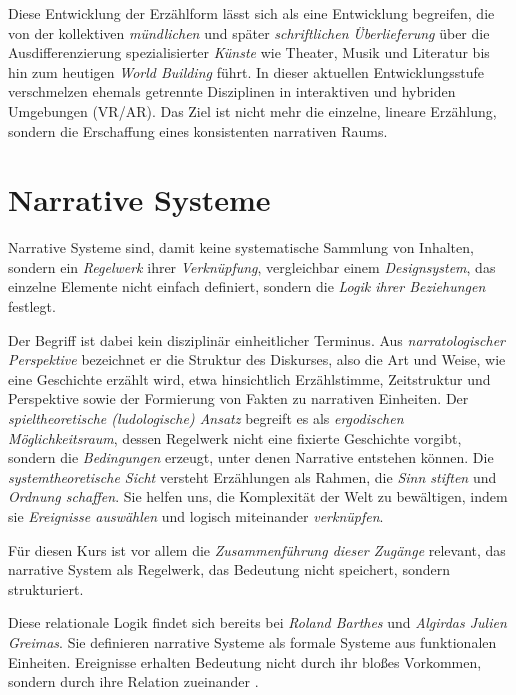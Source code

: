 \documentclass[parskip=half,a4paper,11pt]{scrreprt}
\begin{document}
Diese Entwicklung der Erzählform lässt sich als eine Entwicklung begreifen, die von der kollektiven \textit{mündlichen} und später \textit{schriftlichen} \textit{Überlieferung} über die Ausdifferenzierung spezialisierter \textit{Künste} wie Theater, Musik und Literatur bis hin zum heutigen \textit{World Building} führt. In dieser aktuellen Entwicklungsstufe verschmelzen ehemals getrennte Disziplinen in interaktiven und hybriden Umgebungen (VR/AR). Das Ziel ist nicht mehr die einzelne, lineare Erzählung, sondern die Erschaffung eines konsistenten narrativen Raums.

\section{Narrative Systeme}

Narrative Systeme sind, damit keine systematische Sammlung von Inhalten, sondern ein \textit{Regelwerk} ihrer \textit{Verknüpfung}, vergleichbar einem \textit{Designsystem}, das einzelne Elemente nicht einfach definiert, sondern die \textit{Logik ihrer Beziehungen }festlegt. 

Der Begriff ist dabei kein disziplinär einheitlicher Terminus. Aus \textit{narratologischer Perspektive} \citep{Genette1972,Schmid2005} bezeichnet er die Struktur des Diskurses, also die Art und Weise, wie eine Geschichte erzählt wird, etwa hinsichtlich Erzählstimme, Zeitstruktur und Perspektive sowie der Formierung von Fakten zu narrativen Einheiten. Der \textit{spieltheoretische (ludologische) Ansatz} \citep{Aarseth1997, Murray1997} begreift es als \textit{ergodischen} \textit{Möglichkeitsraum}, dessen Regelwerk nicht eine fixierte Geschichte vorgibt, sondern die \textit{Bedingungen} erzeugt, unter denen Narrative entstehen können. Die \textit{systemtheoretische Sicht} \citep{Luhmann1984,Bruner1990} versteht Erzählungen als Rahmen, die \textit{Sinn stiften} und \textit{Ordnung schaffen}. Sie helfen uns, die Komplexität der Welt zu bewältigen, indem sie \textit{Ereignisse auswählen} und logisch miteinander \textit{verknüpfen}.

Für diesen Kurs ist vor allem die \textit{Zusammenführung dieser Zugänge} relevant, das narrative System als Regelwerk, das Bedeutung nicht speichert, sondern strukturiert.

Diese relationale Logik findet sich bereits bei \textit{Roland Barthes} und \textit{Algirdas Julien Greimas}. Sie definieren narrative Systeme als formale Systeme aus funktionalen Einheiten. Ereignisse erhalten Bedeutung nicht durch ihr bloßes Vorkommen, sondern durch ihre Relation zueinander \citep{Barthes1966,Greimas1966}. 
\end{document}
